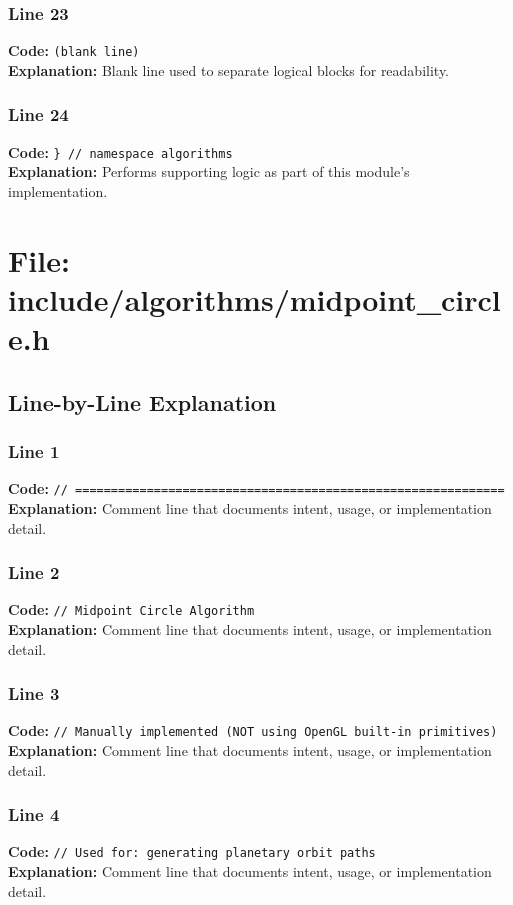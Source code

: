 \documentclass[11pt,a4paper]{article}
\begin{document}
\subsubsection*{Line 23}
\textbf{Code:} \texttt{(blank line)}\\
\textbf{Explanation:} Blank line used to separate logical blocks for readability.

\subsubsection*{Line 24}
\textbf{Code:} \verb|} // namespace algorithms|\\
\textbf{Explanation:} Performs supporting logic as part of this module's implementation.

\newpage
\section{File: include/algorithms/midpoint\_circle.h}
\subsection{Line-by-Line Explanation}
\subsubsection*{Line 1}
\textbf{Code:} \verb|// ============================================================|\\
\textbf{Explanation:} Comment line that documents intent, usage, or implementation detail.

\subsubsection*{Line 2}
\textbf{Code:} \verb|// Midpoint Circle Algorithm|\\
\textbf{Explanation:} Comment line that documents intent, usage, or implementation detail.

\subsubsection*{Line 3}
\textbf{Code:} \verb|// Manually implemented (NOT using OpenGL built-in primitives)|\\
\textbf{Explanation:} Comment line that documents intent, usage, or implementation detail.

\subsubsection*{Line 4}
\textbf{Code:} \verb|// Used for: generating planetary orbit paths|\\
\textbf{Explanation:} Comment line that documents intent, usage, or implementation detail.
\end{document}
